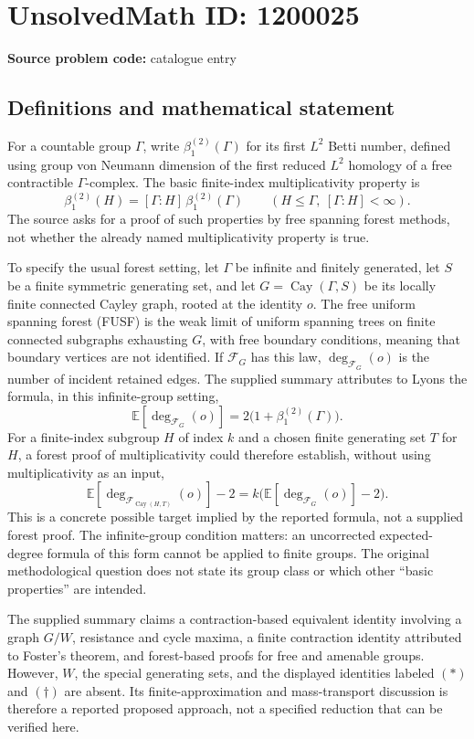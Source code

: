 \documentclass[11pt]{article}
\newcommand{\E}{\mathbb{E}}
\begin{document}
\section*{UnsolvedMath ID: 1200025}
\textbf{Source problem code:} catalogue entry
\subsection{Definitions and mathematical statement}
For a countable group $\Gamma$, write $\beta_1^{(2)}(\Gamma)$ for its first $L^2$ Betti number, defined using group von Neumann dimension of the first reduced $L^2$ homology of a free contractible $\Gamma$-complex. The basic finite-index multiplicativity property is
\[
\beta_1^{(2)}(H)=[\Gamma:H]\,\beta_1^{(2)}(\Gamma)
\qquad(H\le\Gamma,\ [\Gamma:H]<\infty).
\]
The source asks for a proof of such properties by free spanning forest methods, not whether the already named multiplicativity property is true.

To specify the usual forest setting, let $\Gamma$ be infinite and finitely generated, let $S$ be a finite symmetric generating set, and let $G=\operatorname{Cay}(\Gamma,S)$ be its locally finite connected Cayley graph, rooted at the identity $o$. The free uniform spanning forest (FUSF) is the weak limit of uniform spanning trees on finite connected subgraphs exhausting $G$, with free boundary conditions, meaning that boundary vertices are not identified. If $\mathcal F_G$ has this law, $\deg_{\mathcal F_G}(o)$ is the number of incident retained edges. The supplied summary attributes to Lyons the formula, in this infinite-group setting,
\[
\E[\deg_{\mathcal F_G}(o)]=2\bigl(1+\beta_1^{(2)}(\Gamma)\bigr).
\]
For a finite-index subgroup $H$ of index $k$ and a chosen finite generating set $T$ for $H$, a forest proof of multiplicativity could therefore establish, without using multiplicativity as an input,
\[
\E[\deg_{\mathcal F_{\operatorname{Cay}(H,T)}}(o)]-2
=k\bigl(\E[\deg_{\mathcal F_G}(o)]-2\bigr).
\]
This is a concrete possible target implied by the reported formula, not a supplied forest proof. The infinite-group condition matters: an uncorrected expected-degree formula of this form cannot be applied to finite groups. The original methodological question does not state its group class or which other ``basic properties'' are intended.

The supplied summary claims a contraction-based equivalent identity involving a graph $G/W$, resistance and cycle maxima, a finite contraction identity attributed to Foster's theorem, and forest-based proofs for free and amenable groups. However, $W$, the special generating sets, and the displayed identities labeled $(\ast)$ and $(\dagger)$ are absent. Its finite-approximation and mass-transport discussion is therefore a reported proposed approach, not a specified reduction that can be verified here.
\end{document}
